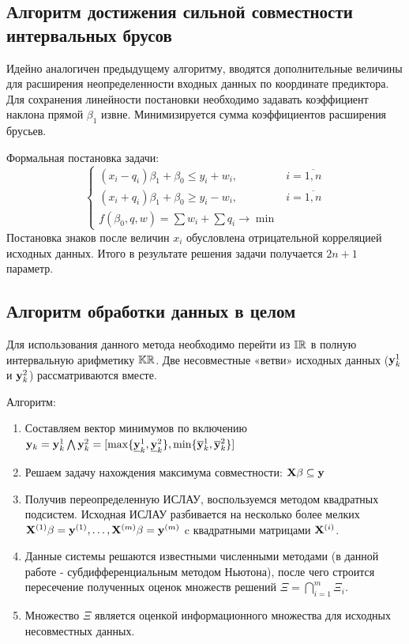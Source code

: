 \documentclass[a4paper]{article}
\begin{document}
\subsection{Алгоритм достижения сильной совместности интервальных брусов}
Идейно аналогичен предыдущему алгоритму, вводятся дополнительные величины для расширения неопределенности входных данных по координате предиктора. Для сохранения линейности постановки необходимо задавать коэффициент наклона прямой $\beta_1$ извне. Минимизируется сумма коэффициентов расширения брусьев. 

Формальная постановка задачи:
\begin{equation}\label{alg2}
\begin{cases}
        (x_i-q_i)\beta_1+\beta_0\leq y_i + w_i,& i=\overline{1,n}\\
        (x_i+q_i)\beta_1+\beta_0\geq y_i - w_i,& i=\overline{1,n}\\
        f(\beta_0,q,w)=\sum w_i+\sum q_i\rightarrow \min
\end{cases}
\end{equation}
Постановка знаков после величин $x_i$ обусловлена отрицательной корреляцией исходных данных. Итого в результате решения задачи получается $2n+1$ параметр.
\subsection{Алгоритм обработки данных в целом}
Для использования данного метода необходимо перейти из $\mathbb{IR}$ в полную интервальную арифметику $\mathbb{KR}$. Две несовместные «ветви» исходных данных ($\mathbf{y}_k^1$ и $\mathbf{y}_k^2$) рассматриваются вместе.

Алгоритм:
\begin{enumerate}
    \item Составляем вектор минимумов по включению $\mathbf{y}_k=\mathbf{y}_k^1\bigwedge\mathbf{y}_k^2=[\max\{\underline{\mathbf{y}}_k^1,\underline{\mathbf{y}}_k^2\}, \min\{\overline{\mathbf{y}}_k^1,\overline{\mathbf{y}}_k^2\}]$
    \item Решаем задачу нахождения максимума совместности: $\mathbf{X}\beta\subseteq\mathbf{y}$
    \item Получив переопределенную ИСЛАУ, воспользуемся методом квадратных подсистем. Исходная ИСЛАУ разбивается на несколько более мелких $\mathbf{X}^{(1)}\beta=\mathbf{y}^{(1)},\dots,\mathbf{X}^{(m)}\beta=\mathbf{y}^{(m)}$ c квадратными матрицами $\mathbf{X}^{(i)}$. 
    \item Данные системы решаются известными численными методами (в данной работе - субдифференциальным методом Ньютона), после чего строится пересечение полученных оценок множеств решений $\Xi=\bigcap_{i=1}^m\Xi_i$.
    \item Множество $\Xi$ является оценкой информационного множества для исходных несовместных данных.
\end{enumerate}
\end{document}
